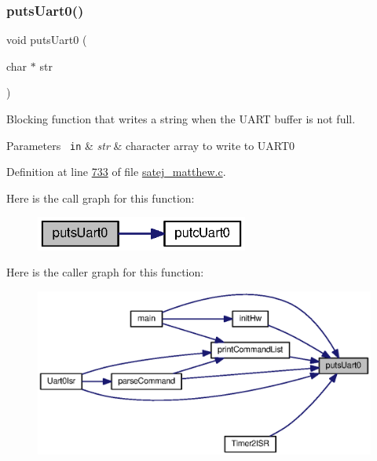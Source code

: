 \subsubsection{\texorpdfstring{putsUart0()}{putsUart0()}}
{\footnotesize\ttfamily void puts\+Uart0 (\begin{DoxyParamCaption}\item[{char $\ast$}]{str }\end{DoxyParamCaption})}



Blocking function that writes a string when the U\+A\+RT buffer is not full. 


\begin{DoxyParams}[1]{Parameters}
\mbox{\texttt{ in}}  & {\em str} & character array to write to U\+A\+R\+T0 \\
\hline
\end{DoxyParams}


Definition at line \mbox{\hyperlink{satej__matthew_8c_source_l00733}{733}} of file \mbox{\hyperlink{satej__matthew_8c_source}{satej\+\_\+matthew.\+c}}.

Here is the call graph for this function\+:\nopagebreak
\begin{figure}[H]
\begin{center}
\leavevmode
\includegraphics[width=198pt]{satej__matthew_8c_af4adb618930ee1a928705aec083cf726_cgraph}
\end{center}
\end{figure}
Here is the caller graph for this function\+:\nopagebreak
\begin{figure}[H]
\begin{center}
\leavevmode
\includegraphics[width=350pt]{satej__matthew_8c_af4adb618930ee1a928705aec083cf726_icgraph}
\end{center}
\end{figure}
\mbox{\label{satej__matthew_8c_a086130ac68735e2ba8d56b2dfe45b914}} 
